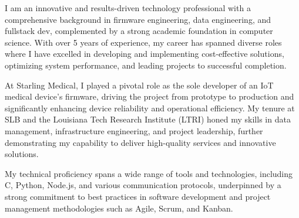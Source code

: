

\begin{cvparagraph}

I am an innovative and results-driven technology professional with a comprehensive background in firmware engineering, data engineering, and fullstack dev, complemented by a strong academic foundation in computer science. With over 5 years of experience, my career has spanned diverse roles where I have excelled in developing and implementing cost-effective solutions, optimizing system performance, and leading projects to successful completion.

At Starling Medical, I played a pivotal role as the sole developer of an IoT medical device's firmware, driving the project from prototype to production and significantly enhancing device reliability and operational efficiency. My tenure at SLB and the Louisiana Tech Research Institute (LTRI) honed my skills in data management, infrastructure engineering, and project leadership, further demonstrating my capability to deliver high-quality services and innovative solutions.

My technical proficiency spans a wide range of tools and technologies, including C, Python, Node.js, and various communication protocols, underpinned by a strong commitment to best practices in software development and project management methodologies such as Agile, Scrum, and Kanban.
\end{cvparagraph}

